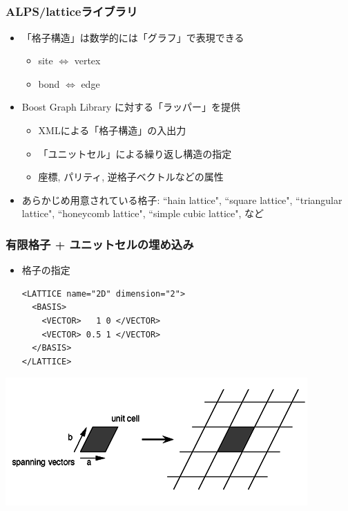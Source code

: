 \subsection*{\redb\whiteb\greenb}

\begin{frame}
  \frametitle{ALPS/latticeライブラリ}
  \begin{itemize}
    \setlength{\itemsep}{1em}
  \item 「格子構造」は数学的には「グラフ」で表現できる
    \begin{itemize}
    \item site $\Leftrightarrow$ vertex
    \item bond $\Leftrightarrow$ edge
    \end{itemize}
  \item Boost Graph Library に対する「ラッパー」を提供
    \begin{itemize}
    \item XMLによる「格子構造」の入出力
    \item 「ユニットセル」による繰り返し構造の指定
    \item 座標, パリティ, 逆格子ベクトルなどの属性
    \end{itemize}
  \item あらかじめ用意されている格子: ``hain lattice", ``square lattice", ``triangular lattice", ``honeycomb lattice", ``simple cubic lattice", など
  \end{itemize}
\end{frame}

\begin{frame}[t,fragile]
  \frametitle{有限格子 + ユニットセルの埋め込み}
  \begin{itemize}
  \item 格子の指定
  \begin{lstlisting}
<LATTICE name="2D" dimension="2">
  <BASIS>
    <VECTOR>   1 0 </VECTOR>
    <VECTOR> 0.5 1 </VECTOR>
  </BASIS>
</LATTICE>
\end{lstlisting}
  \end{itemize}
  \begin{center}
    \includegraphics[height=0.3\textheight]{TutorialLatticeHOWTOLattice1}
  \end{center}
\end{frame}

